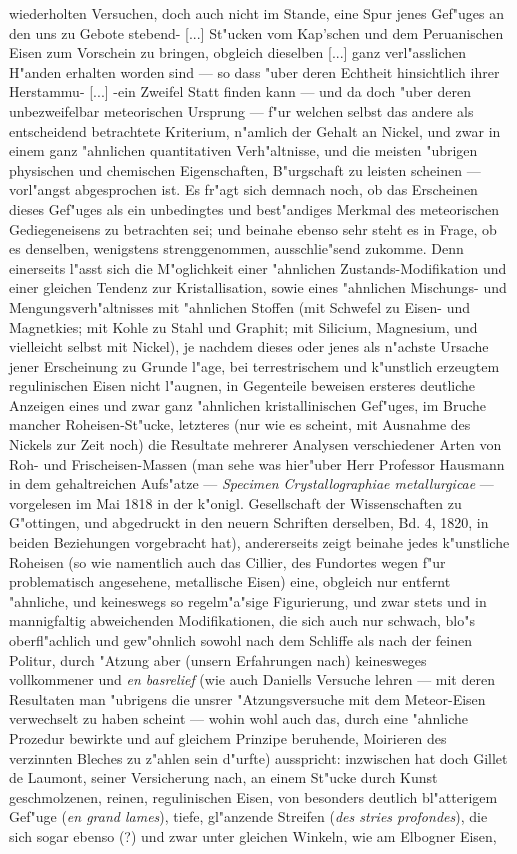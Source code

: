 \documentclass[a4paper, 11pt, oneside, german]{article}
\begin{document}
wiederholten Versuchen, doch auch nicht im Stande, eine Spur jenes Gef"uges an den uns zu Gebote stebend- [...] St"ucken vom Kap'schen und dem Peruanischen Eisen zum Vorschein zu bringen, obgleich dieselben [...] ganz verl"asslichen H"anden erhalten worden sind --- so dass "uber deren Echtheit hinsichtlich ihrer Herstammu- [...] -ein Zweifel Statt finden kann --- und da doch "uber deren unbezweifelbar meteorischen Ursprung --- f"ur welchen selbst das andere als entscheidend betrachtete Kriterium, n"amlich der Gehalt an Nickel, und zwar in einem ganz "ahnlichen quantitativen Verh"altnisse, und die meisten "ubrigen physischen und chemischen Eigenschaften, B"urgschaft zu leisten scheinen --- vorl"angst abgesprochen ist. Es fr"agt sich demnach noch, ob das Erscheinen dieses Gef"uges als ein unbedingtes und best"andiges Merkmal des meteorischen Gediegeneisens zu betrachten sei; und beinahe ebenso sehr steht es in Frage, ob es denselben, wenigstens strenggenommen, ausschlie"send zukomme. Denn einerseits l"asst sich die M"oglichkeit einer "ahnlichen Zustands-Modifikation und einer gleichen Tendenz zur Kristallisation, sowie eines "ahnlichen Mischungs- und Mengungsverh"altnisses mit "ahnlichen Stoffen (mit Schwefel zu Eisen- und Magnetkies; mit Kohle zu Stahl und Graphit; mit Silicium, Magnesium, und vielleicht selbst mit Nickel), je nachdem dieses oder jenes als n"achste Ursache jener Erscheinung zu Grunde l"age, bei terrestrischem und k"unstlich erzeugtem regulinischen Eisen nicht l"augnen, in Gegenteile beweisen ersteres deutliche Anzeigen eines und zwar ganz "ahnlichen kristallinischen Gef"uges, im Bruche mancher Roheisen-St"ucke, letzteres (nur wie es scheint, mit Ausnahme des Nickels zur Zeit noch) die Resultate mehrerer Analysen verschiedener Arten von Roh- und Frischeisen-Massen (man sehe was hier"uber Herr Professor Hausmann in dem gehaltreichen Aufs"atze --- \emph{Specimen Crystallographiae metallurgicae} --- vorgelesen im Mai 1818 in der k"onigl. Gesellschaft der Wissenschaften zu G"ottingen, und abgedruckt in den neuern Schriften derselben, Bd. 4, 1820, in beiden Beziehungen vorgebracht hat), andererseits zeigt beinahe jedes k"unstliche Roheisen (so wie namentlich auch das Cillier, des Fundortes wegen f"ur problematisch angesehene, metallische Eisen) eine, obgleich nur entfernt "ahnliche, und keineswegs so regelm"a"sige Figurierung, und zwar stets und in mannigfaltig abweichenden Modifikationen, die sich auch nur schwach, blo"s oberfl"achlich und gew"ohnlich sowohl nach dem Schliffe als nach der feinen Politur, durch "Atzung aber (unsern Erfahrungen nach) keinesweges vollkommener und \emph{en basrelief} (wie auch Daniells Versuche lehren --- mit deren Resultaten man "ubrigens die unsrer "Atzungsversuche mit dem Meteor-Eisen verwechselt zu haben scheint --- wohin wohl auch das, durch eine "ahnliche Prozedur bewirkte und auf gleichem Prinzipe beruhende, Moirieren des verzinnten Bleches zu z"ahlen sein d"urfte) ausspricht: inzwischen hat doch Gillet de Laumont, seiner Versicherung nach, an einem St"ucke durch Kunst geschmolzenen, reinen, regulinischen Eisen, von besonders deutlich bl"atterigem Gef"uge (\emph{en grand lames}), tiefe, gl"anzende Streifen (\emph{des stries profondes}), die sich sogar ebenso (?) und zwar unter gleichen Winkeln, wie am Elbogner Eisen, 
\end{document}
